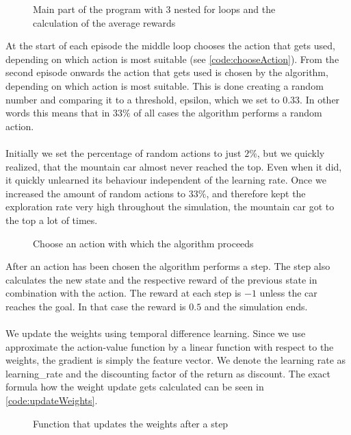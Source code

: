 \documentclass{article}
\begin{document}
	\begin{figure}[h]
		\caption{Main part of the program with 3 nested for loops and the calculation of the average rewards}
		\label{code:loops}
		
	\end{figure}
	
	\FloatBarrier
	
	\noindent At the start of each episode the middle loop chooses the action that gets used, depending on which action is most suitable (see \autoref{code:chooseAction}). From the second episode onwards the action that gets used is chosen by the algorithm, depending on which action is most suitable. This is done creating a random number and comparing it to a threshold, epsilon, which we set to $0.33$. In other words this means that in $33\%$ of all cases the algorithm performs a random action. \\
	\\
	Initially we set the percentage of random actions to just $2\%$, but we quickly realized, that the mountain car almost never reached the top. Even when it did, it quickly unlearned its behaviour independent of the learning rate.  Once we increased the amount of random actions to $33\%$, and therefore kept the exploration rate very high throughout the simulation, the mountain car got to the top a lot of times.

	\begin{figure}
		\caption{Choose an action with which the algorithm proceeds}
		\label{code:chooseAction}
		
	\end{figure}
	\newpage
	
	\noindent After an action has been chosen the algorithm performs a step. The step also calculates the new state and the respective reward of the previous state in combination with the action. The reward at each step is $-1$ unless the car reaches the goal. In that case the reward is $0.5$ and the simulation ends. \\
	\\
	We update the weights using temporal difference learning. Since we use approximate the action-value function by a linear function with respect to the weights, the gradient is simply the feature vector. We denote the learning rate as learning\_rate and the discounting factor of the return as discount. 
	The exact formula how the weight update gets calculated can be seen in \autoref{code:updateWeights}.
	
	\begin{figure}[h]
		\caption{Function that updates the weights after a step}
		\label{code:updateWeights}
		
	\end{figure}
	
\end{document}
